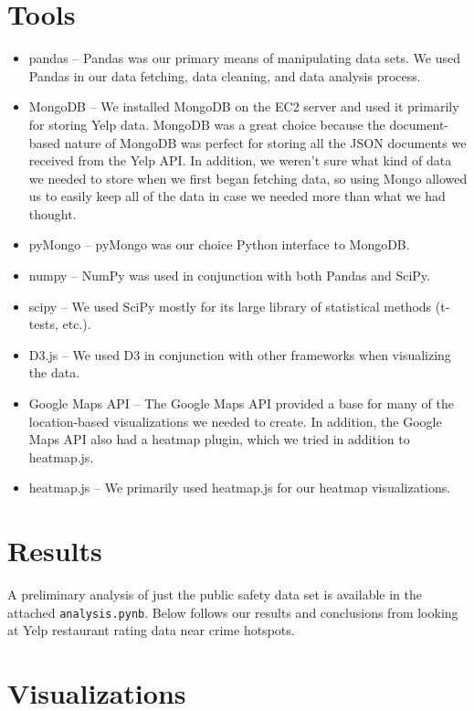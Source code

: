 \documentclass{article}
\begin{document}
\section{Tools}

\begin{itemize}
\item pandas -- Pandas was our primary means of manipulating data sets. We
  used Pandas in our data fetching, data cleaning, and data analysis
  process.
\item MongoDB -- We installed MongoDB on the EC2 server and used it
  primarily for storing Yelp data. MongoDB was a great choice because the
  document-based nature of MongoDB was perfect for storing all the JSON
  documents we received from the Yelp API. In addition, we weren't sure
  what kind of data we needed to store when we first began fetching data,
  so using Mongo allowed us to easily keep all of the data in case we
  needed more than what we had thought.
\item pyMongo -- pyMongo was our choice Python interface to MongoDB.
\item numpy -- NumPy was used in conjunction with both Pandas and SciPy.
\item scipy -- We used SciPy mostly for its large library of statistical
  methods (t-tests, etc.).
\item D3.js -- We used D3 in conjunction with other frameworks when
  visualizing the data.
\item Google Maps API -- The Google Maps API provided a base for many of
  the location-based visualizations we needed to create. In addition, the
  Google Maps API also had a heatmap plugin, which we tried in addition to
  heatmap.js.
\item heatmap.js -- We primarily used heatmap.js for our heatmap
  visualizations.
\end{itemize}

\section{Results}
\label{sec:results}

A preliminary analysis of just the public safety data set is available in
the attached \texttt{analysis.pynb}. Below follows our results and
conclusions from looking at Yelp restaurant rating data near crime
hotspots.

\section{Visualizations}
\end{document}
